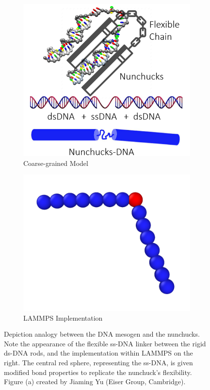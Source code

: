 \documentclass[11pt, a4paper]{article} %
\begin{document}
\begin{figure}[ht]
	\hfill  %
	\begin{subfigure}{.4\textwidth}
		\centering
		\includegraphics[width=\linewidth]{Figures/nunchucks_artist}  
		\caption{Coarse-grained Model}
		\label{fig:nunchuck_analogy}
	\end{subfigure}
	\hfill %
	\begin{subfigure}{.4\textwidth}
		\centering
		\includegraphics[width=\linewidth]{Figures/nunchuck_profile_coloured}  
		\caption{LAMMPS Implementation}
		\label{fig:nunchuck_implementation}
	\end{subfigure}
	\caption{Depiction analogy between the DNA mesogen and the nunchucks. Note the appearance of the flexible ss-DNA linker between the rigid ds-DNA rods, and the implementation within LAMMPS on the right. The central red sphere, representing the ss-DNA, is given modified bond properties to replicate the nunchuck's flexibility. Figure (a) created by Jiaming Yu (Eiser Group, Cambridge).}
	\label{fig:nunchucks_visual}
	\hfill
\end{figure}
\end{document}
